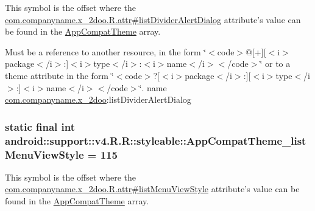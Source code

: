 This symbol is the offset where the \hyperlink{classcom_1_1companyname_1_1x__2doo_1_1_r_1_1attr_3d36b2377163f3962672aaeabe780d8a}{com.companyname.x\_\-2doo.R.attr\#listDividerAlertDialog} attribute's value can be found in the \hyperlink{classandroid_1_1support_1_1v4_1_1_r_1_1styleable_0873e92ba21076bb5a4aeadeb7f5779f}{AppCompatTheme} array.

Must be a reference to another resource, in the form \char`\"{}$<$code$>$@\mbox{[}+\mbox{]}\mbox{[}$<$i$>$package$<$/i$>$:\mbox{]}$<$i$>$type$<$/i$>$:$<$i$>$name$<$/i$>$$<$/code$>$\char`\"{} or to a theme attribute in the form \char`\"{}$<$code$>$?\mbox{[}$<$i$>$package$<$/i$>$:\mbox{]}\mbox{[}$<$i$>$type$<$/i$>$:\mbox{]}$<$i$>$name$<$/i$>$$<$/code$>$\char`\"{}.  name \hyperlink{namespacecom_1_1companyname_1_1x__2doo}{com.companyname.x\_\-2doo}:listDividerAlertDialog \hypertarget{classandroid_1_1support_1_1v4_1_1_r_1_1styleable_1b00f2d6ba69378b7ec0cfccf25c0f46}{
\subsubsection[{AppCompatTheme\_\-listMenuViewStyle}]{\setlength{\rightskip}{0pt plus 5cm}static final int android::support::v4.R.R::styleable::AppCompatTheme\_\-listMenuViewStyle = 115}}
\label{classandroid_1_1support_1_1v4_1_1_r_1_1styleable_1b00f2d6ba69378b7ec0cfccf25c0f46}


This symbol is the offset where the \hyperlink{classcom_1_1companyname_1_1x__2doo_1_1_r_1_1attr_0e69a8ad9db1f4508c2656f05d026ede}{com.companyname.x\_\-2doo.R.attr\#listMenuViewStyle} attribute's value can be found in the \hyperlink{classandroid_1_1support_1_1v4_1_1_r_1_1styleable_0873e92ba21076bb5a4aeadeb7f5779f}{AppCompatTheme} array.

